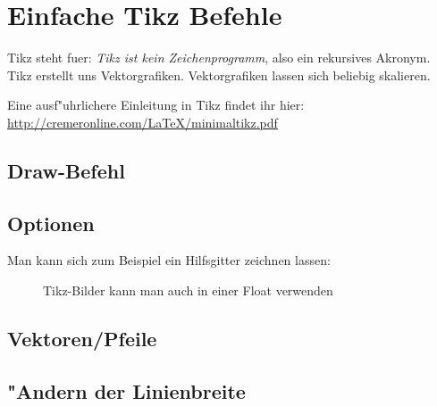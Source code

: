 \documentclass[10pt, a4paper]{article}
\begin{document}
\section{Einfache Tikz Befehle}
Tikz steht fuer: \textit{Tikz ist kein Zeichenprogramm}, also ein rekursives Akronym. Tikz erstellt uns Vektorgrafiken. Vektorgrafiken lassen sich beliebig skalieren.

Eine ausf"uhrlichere Einleitung in Tikz findet ihr hier: \url{http://cremeronline.com/LaTeX/minimaltikz.pdf}


\subsection{Draw-Befehl}

\subsection{Optionen}

Man kann sich zum Beispiel ein Hilfsgitter zeichnen lassen:


\begin{figure}[h]
\centering
{}
\caption{Tikz-Bilder kann man auch in einer Float verwenden}
\end{figure}

\subsection{Vektoren/Pfeile}


\subsection{"Andern der Linienbreite}
\end{document}
